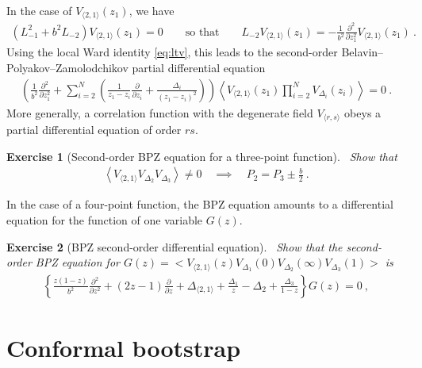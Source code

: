 \documentclass[12pt, a4paper]{article}
\theoremstyle{break}
\newtheorem{exo}{Exercise}[section]
\begin{document}
In the case of $V_{\langle 2, 1 \rangle}(z_1)$, we have  
\begin{align}
\left(L_{-1}^2 + b^2 L_{-2}\right) V_{\langle 2, 1 \rangle}(z_1)  = 0\qquad \text{so that} \qquad L_{-2}V_{\langle 2, 1 \rangle}(z_1) = -\frac{1}{b^2}\frac{\partial^2}{\partial z_1^2} V_{\langle 2, 1 \rangle}(z_1)\ .
\end{align}
Using the local Ward identity \eqref{eq:ltv},
this leads to the second-order Belavin--Polyakov--Zamolodchikov partial differential equation
\begin{align}
 \left( \frac{1}{b^2}\frac{\partial^2}{\partial z_1^2} + \sum_{i=2}^N\left(\frac{1}{z_1-z_i}\frac{\partial}{\partial z_i} +\frac{\Delta_i}{(z_1-z_i)^2}\right) \right)\left< V_{\langle 2, 1 \rangle}(z_1) \prod_{i=2}^N V_{\Delta_i}(z_i) \right>  = 0\ .
 \label{eq:bpz}
\end{align}
More generally, a correlation function with the degenerate field $V_{\langle r,s\rangle}$ obeys a partial differential equation of order $rs$. 
\begin{exo}[Second-order BPZ equation for a three-point function]
 ~\label{exo:bpz3pt}
 Show that 
\begin{align}
 \left< V_{\langle 2, 1 \rangle} V_{\Delta_2} V_{\Delta_3} \right> \neq 0 \quad \implies \quad 
 P_2 = P_3 \pm \frac{b}{2}\ .
 \label{eq:alpm}
\end{align}
\end{exo}
In the case of a four-point function, the BPZ equation amounts to a differential equation for the function of one variable $G(z)$.

\begin{exo}[BPZ second-order differential equation]
 ~\label{exo:bpz}
 Show that the second-order BPZ equation for $G(z)=\Big< V_{\langle 2, 1 \rangle}(z) V_{\Delta_1}(0)V_{\Delta_2}(\infty)V_{\Delta_3}(1) \Big>$ is
 \begin{align}
  \left\{ \frac{z(1-z)}{b^2}\frac{\partial^2}{\partial z^2} + (2z-1){\frac{\partial}{\partial z}} +\Delta_{\langle 2,1 \rangle} +\frac{\Delta_1}{z}-\Delta_2 + \frac{\Delta_3}{1-z}\right\} G(z)=0\ ,
\label{eq:ode}
 \end{align}
\end{exo}


\section{Conformal bootstrap}
\end{document}
